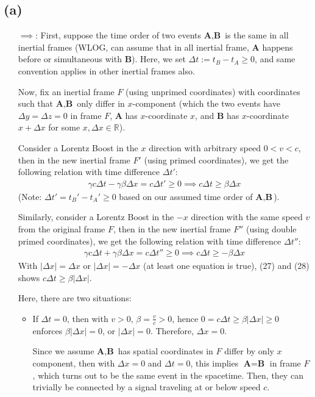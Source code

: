 \documentclass{article}
\newcommand{\RR}{\mathbb{R}}
\newcommand{\bA}{\textbf{A}}
\newcommand{\bB}{\textbf{B}}
\begin{document}
\subsection*{(a)}
\begin{itemize}
    \item[$\implies$:] First, suppose the time order of two events $\bA, \bB$ is the same in all inertial frames (WLOG, can assume that in all inertial frame, $\bA$ happens before or simultaneous with $\bB$). Here, we set $\Delta t:=t_B-t_A \geq 0$, and same convention applies in other inertial frames also.
    
    Now, fix an inertial frame $F$ (using unprimed coordinates) with coordinates such that $\bA,\bB$ only differ in $x$-component (which the two events have $\Delta y=\Delta z=0$ in frame $F$, $\bA$ has $x$-coordinate $x$, and $\bB$ has $x$-coordinate $x+\Delta x$ for some $x,\Delta x\in\RR$). 

    Consider a Lorentz Boost in the $x$ direction with arbitrary speed $0< v<c$, then in the new inertial frame $F'$ (using primed coordinates), we get the following relation with time difference $\Delta t'$:
    \begin{align}
         \gamma c\Delta t-\gamma\beta \Delta x =c\Delta t'\geq 0\implies c\Delta t \geq \beta \Delta x
    \end{align}
    (Note: $\Delta t' = t_B' - t_A' \geq 0$ based on our assumed time order of $\bA,\bB$).

    Similarly, consider a Lorentz Boost in the $-x$ direction with the same speed $v$ from the original frame $F$, then in the new inertial frame $F''$ (using double primed coordinates), we get the following relation with time difference $\Delta t''$:
    \begin{align}
        \gamma c\Delta t + \gamma\beta \Delta x = c\Delta t'' \geq 0\implies c\Delta t \geq -\beta \Delta x
    \end{align}
    With $|\Delta x| = \Delta x$ or $|\Delta x| = -\Delta x$ (at least one equation is true), (27) and (28) shows $c\Delta t\geq \beta |\Delta x|$.

    Here, there are two situations:
    \begin{itemize}
        \item If $\Delta t=0$, then with $v>0$, $\beta =\frac{v}{c}>0$, hence $0=c\Delta t \geq \beta |\Delta x|\geq 0$ enforces $\beta |\Delta x|=0$, or $|\Delta x|=0$. Therefore, $\Delta x = 0$.
        
        Since we assume $\bA,\bB$ has spatial coordinates in $F$ differ by only $x$ component, then with $\Delta x=0$ and $\Delta t=0$, this implies $\bA=\bB$ in frame $F$, which turns out to be the same event in the spacetime. Then, they can trivially be connected by a signal traveling at or below speed $c$.


\end{itemize}
\end{itemize}
\end{document}
